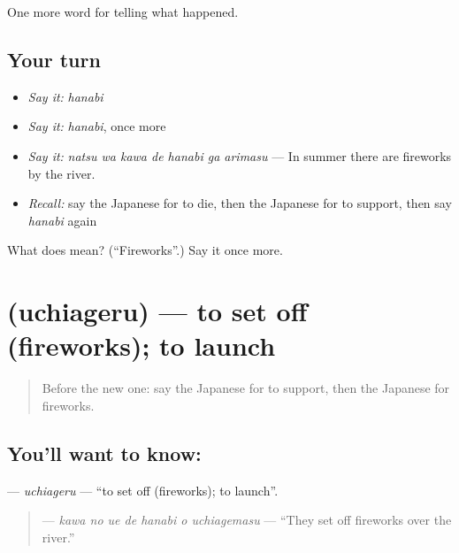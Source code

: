 \begin{grammarlens}[title={What you've built}]
One more word for telling what happened.
\end{grammarlens}

\subsection*{Your turn}
\begin{itemize}
\raggedright
  \item \emph{Say it:} \emph{hanabi}
  \item \emph{Say it:} \emph{hanabi}, once more
  \item \emph{Say it:} \emph{natsu wa kawa de hanabi ga arimasu} — In summer there are fireworks by the river.
  \item \emph{Recall:} say the Japanese for to die, then the Japanese for to support, then say \emph{hanabi} again
\end{itemize}

\begin{tcolorbox}[breakable,colback=teal!4,colframe=teal!35!black,title={Before you move on}]
What does  mean? (\textquotedblleft{}Fireworks\textquotedblright{}.) Say it once more.
\end{tcolorbox}
\section[\texorpdfstring{\ja{うちあげる} (uchiageru)}{うちあげる (uchiageru)}]{ (uchiageru) — to set off (fireworks); to launch}

\label{lesson:JA-C293-uchiageru}



\begin{quote}
Before the new one: say the Japanese for to support, then the Japanese for fireworks.
\end{quote}

\subsection*{You'll want to know: }
\textbf{} — \emph{uchiageru} — \textquotedblleft{}to set off (fireworks); to launch\textquotedblright{}.

\begin{quote}
\textbf{   } — \emph{kawa no ue de hanabi o uchiagemasu} — \textquotedblleft{}They set off fireworks over the river.\textquotedblright{}
\end{quote}

